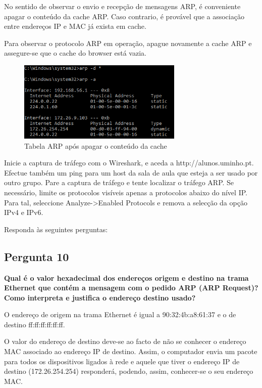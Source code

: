 \documentclass[11pt]{article}
\begin{document}
\vspace{0.5cm}

No sentido de observar o envio e recepção de mensagens ARP, é conveniente apagar o conteúdo da cache ARP. Caso contrario, é provável que a associação entre endereços IP e MAC já exista em cache.

Para observar o protocolo ARP em operação, apague novamente a cache ARP e assegure-se que o cache do browser está vazia.
\clearpage
\begin{figure}[hbt!]
    \centering
    \includegraphics[width=0.7\textwidth]{images/cap4/tabela_ARP_delete.png}
    \caption{Tabela ARP após apagar o conteúdo da cache}
\end{figure}

Inicie a captura de tráfego com o Wireshark, e aceda a http://alunos.uminho.pt. Efectue também um ping para um host da sala de aula que esteja a ser usado por outro grupo. Pare a captura de tráfego e tente localizar o tráfego ARP. Se necessário, limite os protocolos visíveis apenas a protocolos abaixo do nível IP. Para tal, seleccione Analyze->Enabled Protocols e remova a selecção da opção IPv4 e IPv6.

Responda às seguintes perguntas:

\subsection{Pergunta 10}

\textbf{Qual é o valor hexadecimal dos endereços origem e destino na trama Ethernet que contém a mensagem com o pedido ARP (ARP Request)? Como interpreta e justifica o endereço destino usado?}

O endereço de origem na trama Ethernet é igual a 90:32:4b:a8:61:37 e o de destino ff:ff:ff:ff:ff:ff.

O valor do endereço de destino deve-se ao facto de não se conhecer o endereço MAC associado ao endereço IP de destino. Assim, o computador envia um pacote para todos os dispositivos ligados à rede e aquele que tiver o endereço IP de destino (172.26.254.254) responderá, podendo, assim, conhecer-se o seu endereço MAC.
\end{document}
